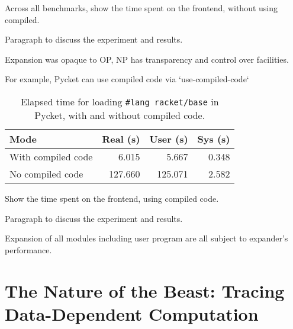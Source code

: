 		\begin{show-experiment}
			Across all benchmarks, show the time spent on the frontend, without using compiled.
		\end{show-experiment}

		\begin{paragraph-here}
			Paragraph to discuss the experiment and results.
		\end{paragraph-here}

		\begin{paragraph-here}
			Expansion was opaque to OP, NP has transparency and control over facilities.
		\end{paragraph-here}

		\begin{paragraph-here}
			For example, Pycket can use compiled code via `use-compiled-code`
		\end{paragraph-here}

		\begin{table}[ht]
		\centering
		\begin{tabular}{@{}lrrr@{}}
			\toprule
			Mode & Real (s) & User (s) & Sys (s) \\ \midrule
			With compiled code       &   6.015 &   5.667 & 0.348 \\
			No compiled code  & 127.660 & 125.071 & 2.582 \\ \bottomrule
		\end{tabular}
		\caption{Elapsed time for loading \texttt{\#lang racket/base} in Pycket, with and without compiled code.}
		\label{tab:a-rkt-timing}
		\end{table}

		\begin{show-experiment}
			Show the time spent on the frontend, using compiled code.
		\end{show-experiment}

		\begin{paragraph-here}
			Paragraph to discuss the experiment and results.
		\end{paragraph-here}

		\begin{paragraph-here}
			Expansion of all modules including user program are all subject to expander's performance.
		\end{paragraph-here}

	\section{The Nature of the Beast: Tracing Data-Dependent Computation}
	\label{section:nature-of-the-beast}

